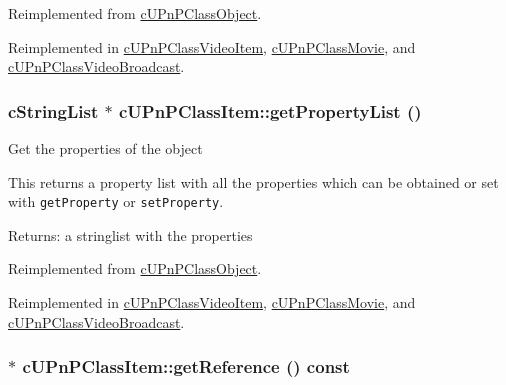 Reimplemented from \hyperlink{classcUPnPClassObject_539cf36abc96b95bc8437601fed8a0f6}{cUPnPClassObject}.

Reimplemented in \hyperlink{classcUPnPClassVideoItem_94ab2ffcbe14abb63c680e6748e70ef1}{cUPnPClassVideoItem}, \hyperlink{classcUPnPClassMovie_b4c1d5a973856469b93d2033b65d7ba2}{cUPnPClassMovie}, and \hyperlink{classcUPnPClassVideoBroadcast_e1d13a13de094337cea6be214c4da0f0}{cUPnPClassVideoBroadcast}.\hypertarget{classcUPnPClassItem_add0c9d378036e270e6f99d8d1409e3b}{
\subsubsection[{getPropertyList}]{\setlength{\rightskip}{0pt plus 5cm}cStringList $\ast$ cUPnPClassItem::getPropertyList ()}}
\label{classcUPnPClassItem_add0c9d378036e270e6f99d8d1409e3b}


Get the properties of the object

This returns a property list with all the properties which can be obtained or set with {\tt getProperty} or {\tt setProperty}.

\begin{Desc}
\item[Returns:]a stringlist with the properties \end{Desc}


Reimplemented from \hyperlink{classcUPnPClassObject_4a4d2cd2e59d364050bb64a3d9dced6e}{cUPnPClassObject}.

Reimplemented in \hyperlink{classcUPnPClassVideoItem_9dc397419b45535a3e6a676667b619a4}{cUPnPClassVideoItem}, \hyperlink{classcUPnPClassMovie_b62e6dac175090b82c47f955e29c146c}{cUPnPClassMovie}, and \hyperlink{classcUPnPClassVideoBroadcast_192f6a04c87fe8d56f99c71337cf0f68}{cUPnPClassVideoBroadcast}.\hypertarget{classcUPnPClassItem_153dcb71951d47891d1e066f97e6cd29}{
\subsubsection[{getReference}]{$\ast$ cUPnPClassItem::getReference () const}}
\label{classcUPnPClassItem_153dcb71951d47891d1e066f97e6cd29}



